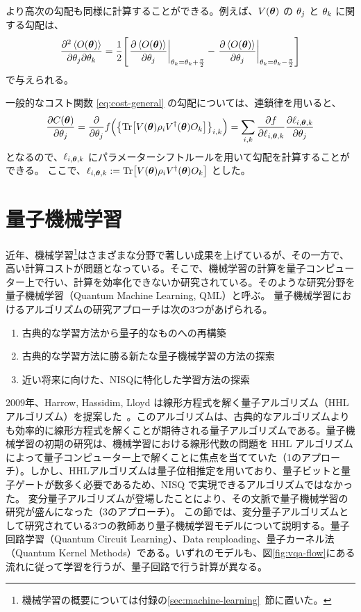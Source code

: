 より高次の勾配も同様に計算することができる。例えば、$V(\boldsymbol{\theta})$ の $\theta_j$ と $\theta_k$ に関する勾配は、
\begin{align}
    \pdv{\expval{O(\bs{\th})}}{\th_j}{\th_k}
    = \frac12\qty[\eval{\pdv{\expval{O(\bs{\th})}}{\th_j}}_{\th_k = \th_k + \frac{\pi}{2}}
    - \eval{\pdv{\expval{O(\bs{\th})}}{\th_j}}_{\th_k = \th_k - \frac{\pi}{2}}]
\end{align}
で与えられる。

一般的なコスト関数 \eqref{eq:cost-general} の勾配については、連鎖律を用いると、
\begin{align}
    \pdv{C(\boldsymbol{\theta})}{\theta_j}
    = \pdv{\theta_j}f\qty(\qty{\Tr[V(\boldsymbol{\theta}) \rho_i V^\dagger(\boldsymbol{\theta}) O_k]}_{i,k})
    = \sum_{i,k}\pdv{f}{\ell_{i,\boldsymbol{\theta},k}}\pdv{\ell_{i,\boldsymbol{\theta},k}}{\theta_j}
\end{align}
となるので、$\ell_{i,\boldsymbol{\theta},k}$ にパラメーターシフトルールを用いて勾配を計算することができる。
ここで、$\ell_{i,\boldsymbol{\theta},k} := \Tr[V(\boldsymbol{\theta}) \rho_i V^\dagger(\boldsymbol{\theta}) O_k]$ とした。



\section{量子機械学習}\label{sec:qml}
近年、機械学習\footnote{機械学習の概要については付録の\ref{sec:machine-learning}~節に置いた。}はさまざまな分野で著しい成果を上げているが、その一方で、高い計算コストが問題となっている。そこで、機械学習の計算を量子コンピューター上で行い、計算を効率化できないか研究されている。そのような研究分野を量子機械学習（Quantum Machine Learning, QML）と呼ぶ。
量子機械学習におけるアルゴリズムの研究アプローチは次の3つがあげられる\cite{guan2021quantum}。
\begin{enumerate}
    \item 古典的な学習方法から量子的なものへの再構築
    \item 古典的な学習方法に勝る新たな量子機械学習の方法の探索
    \item 近い将来に向けた、NISQに特化した学習方法の探索
\end{enumerate}

2009年、Harrow, Hassidim, Lloyd は線形方程式を解く量子アルゴリズム（HHLアルゴリズム）を提案した~\cite{harrow2009quantum}。このアルゴリズムは、古典的なアルゴリズムよりも効率的に線形方程式を解くことが期待される量子アルゴリズムである。量子機械学習の初期の研究は、機械学習における線形代数の問題を HHL アルゴリズムによって量子コンピューター上で解くことに焦点を当てていた（1のアプローチ）。しかし、HHLアルゴリズムは量子位相推定を用いており、量子ビットと量子ゲートが数多く必要であるため、NISQ で実現できるアルゴリズムではなかった。
変分量子アルゴリズムが登場したことにより、その文脈で量子機械学習の研究が盛んになった（3のアプローチ）。
この節では、変分量子アルゴリズムとして研究されている3つの教師あり量子機械学習モデルについて説明する。量子回路学習（Quantum Circuit Learning）\cite{mitarai2018quantum,farhi2018classification}、Data reuploading\cite{perez-salinas2020data,lloyd2020quantum,schuld2021effect}、量子カーネル法（Quantum Kernel Methods）\cite{havlicek2019supervised,schuld2019quantum,schuld2021supervised}である。いずれのモデルも、図\ref{fig:vqa-flow}にある流れに従って学習を行うが、量子回路で行う計算が異なる。

